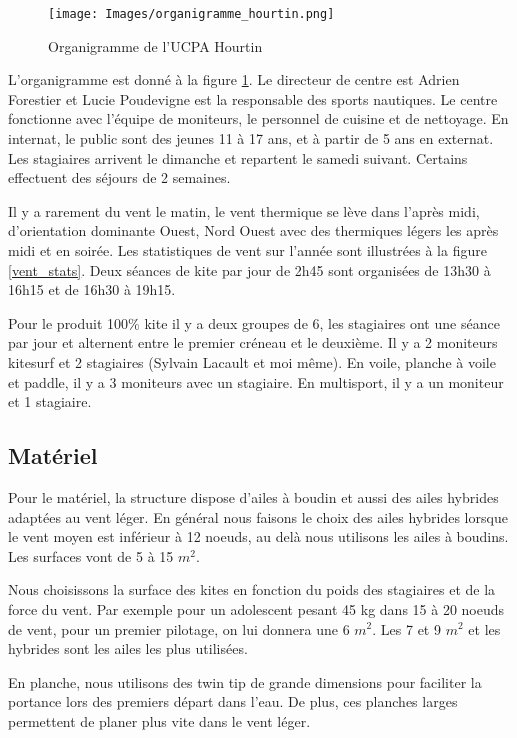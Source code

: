 \documentclass[11pt,a4paper]{report}
\begin{document}
\begin{figure}[h]
\centering
\texttt{[image: Images/organigramme\_hourtin.png]} 
\caption{Organigramme de l'UCPA Hourtin\label{organi_hourtin}}
\end{figure}

L'organigramme est donné à la figure \ref{organi_hourtin}.
Le directeur de centre est Adrien Forestier et 
Lucie Poudevigne est la responsable des sports nautiques.
Le centre fonctionne avec l'équipe de moniteurs, le personnel 
de cuisine et de nettoyage. En internat, le public sont des jeunes
11 à 17 ans, et  à partir de 5 ans  en externat.
Les stagiaires arrivent le dimanche et repartent
le samedi suivant. Certains effectuent des séjours de 2 semaines.

Il y a rarement du vent le matin, le vent thermique se lève dans
l'après midi, d'orientation dominante Ouest, Nord Ouest avec des
thermiques légers les après midi et  en soirée. Les statistiques
de vent sur l'année sont illustrées à la figure \ref{vent_stats}.
Deux séances de kite par jour de 2h45 sont organisées de
13h30 à 16h15 et de 16h30 à 19h15. 

Pour le produit 100\% kite il y a deux groupes de 6, les stagiaires ont
une séance par jour et alternent entre le premier créneau et le deuxième.
Il y a 2 moniteurs kitesurf et 2 stagiaires (Sylvain Lacault et moi m\^eme).
En voile, planche à voile et paddle, il y a 3 moniteurs avec un stagiaire.
En multisport, il y a un moniteur et 1 stagiaire.

\subsection{Matériel}
Pour le matériel, la structure dispose d'ailes à boudin et aussi 
des ailes hybrides adaptées au vent léger. En général nous faisons
le choix des ailes hybrides lorsque le vent moyen est inférieur à
12 noeuds, au delà nous utilisons les ailes à boudins. Les
surfaces vont de 5 à 15 $m^2$. 

Nous choisissons la surface des kites
en fonction du poids des stagiaires et de la force du vent.
Par exemple pour un adolescent pesant 45 kg dans 15 à 20 noeuds
de vent, pour un premier pilotage, on lui donnera une 6 $m^2$.
Les 7 et 9 $m^2$ et les hybrides sont les ailes les plus utilisées.

En planche, nous utilisons des twin tip de grande dimensions 
pour faciliter la portance lors des premiers départ dans l'eau.
De plus, ces planches larges permettent de planer plus vite
dans le vent léger.
\end{document}
